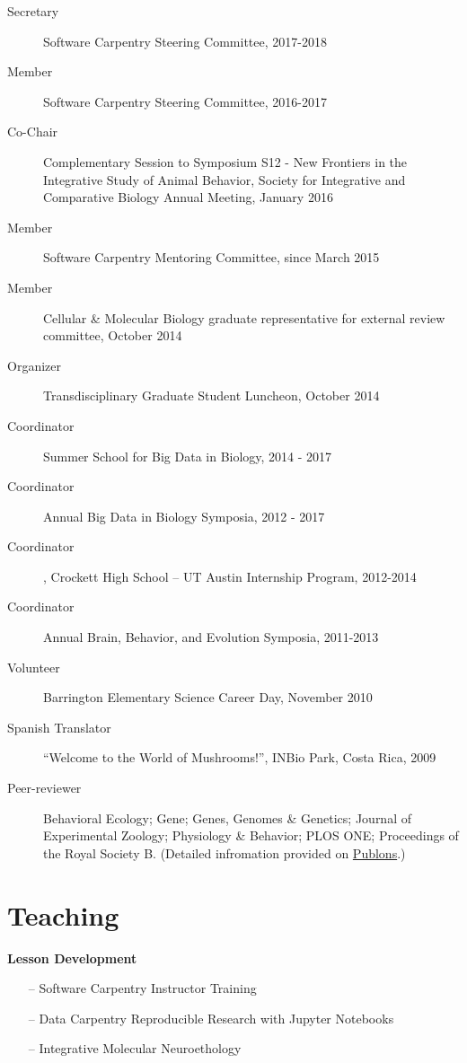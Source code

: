 \documentclass[margin,line]{resume}
\begin{document}
\begin{resume}
\begin{description}
\item[Secretary] Software Carpentry Steering Committee, 2017-2018
\item[Member] Software Carpentry Steering Committee, 2016-2017
\item[Co-Chair] Complementary Session to Symposium S12 - New Frontiers in the Integrative Study of Animal Behavior, Society for Integrative and Comparative Biology Annual Meeting, January 2016
\item[Member] Software Carpentry Mentoring Committee, since March 2015
\item[Member] Cellular \& Molecular Biology graduate representative for external review committee, October 2014 
\item[Organizer] Transdisciplinary Graduate Student Luncheon, October 2014
\item[Coordinator] Summer School for Big Data in Biology, 2014 - 2017
\item[Coordinator] Annual Big Data in Biology Symposia, 2012 - 2017 
\item[Coordinator] , Crockett High School – UT Austin Internship Program, 2012-2014
\item[Coordinator] Annual Brain, Behavior, and Evolution Symposia, 2011-2013
\item[Volunteer] Barrington Elementary Science Career Day, November 2010
\item[Spanish Translator] “Welcome to the World of Mushrooms!”, INBio Park, Costa Rica, 2009
\item[Peer-reviewer] Behavioral Ecology; Gene; Genes, Genomes \& Genetics; Journal of Experimental Zoology; Physiology \& Behavior; PLOS ONE; Proceedings of the Royal Society B. (Detailed infromation provided on \href{https://publons.com/author/444397/rayna-harris#profile)}{Publons}.) 
\end{description}

    
\section{\mysidestyle Teaching}

{\bf Lesson Development}
\begin{itemize}
\raggedright
\item[--] Software Carpentry Instructor Training
\item[--] Data Carpentry Reproducible Research with Jupyter Notebooks
\item[--] Integrative Molecular Neuroethology


\end{itemize}
\end{resume}
\end{document}

